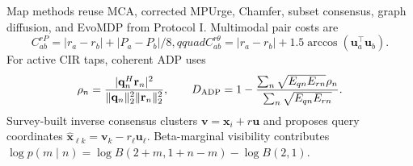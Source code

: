 \documentclass[10pt]{article}
\begin{document}
Map methods reuse MCA, corrected MPUrge, Chamfer, subset consensus, graph
diffusion, and EvoMDP from Protocol I.  Multimodal pair costs are
\begin{equation}
 C_{ab}^{rP}=|r_a-r_b|+|P_a-P_b|/8,qquad
 C_{ab}^{r\theta}=|r_a-r_b|+1.5\arccos(\mathbf u_a^\top\mathbf u_b).
\end{equation}
For active CIR taps, coherent ADP uses
\begin{equation}
 \rho_n=\frac{|\mathbf q_n^H\mathbf r_n|^2}
 {\|\mathbf q_n\|_2^2\|\mathbf r_n\|_2^2},\qquad
 D_{\rm ADP}=1-\frac{\sum_n\sqrt{E_{qn}E_{rn}}\rho_n}
 {\sum_n\sqrt{E_{qn}E_{rn}}}.
\end{equation}
Survey-built inverse consensus clusters $\mathbf v=\mathbf x_i+r\mathbf u$
and proposes query coordinates $\widehat{\mathbf x}_{\ell k}=\mathbf v_k-r_\ell\mathbf u_\ell$.
Beta-marginal visibility contributes
$\log p(m\mid n)=\log B(2+m,1+n-m)-\log B(2,1)$.
\end{document}
